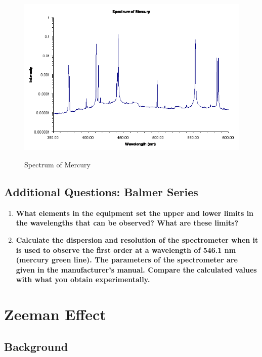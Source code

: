\documentclass{../lab}
\begin{document}
\begin{figure}[h]
    \centering
    \href{http://experimentationlab.berkeley.edu/sites/default/files/images/Atmimage015.gif}{\includegraphics[width=0.8\linewidth]{images/Atmimage015.png}}
    \caption{Spectrum of Mercury}
    \label{fig:Atmimage015}
\end{figure}

\subsection{Additional Questions: Balmer Series}


    \begin{enumerate}

       \item \textbf{What elements in the equipment set the upper and lower limits in the wavelengths that can be observed? What are these limits?}

       \item \textbf{Calculate the dispersion and resolution of the spectrometer when it is used to observe the first order at a wavelength of 546.1 nm (mercury green line). The parameters of the spectrometer are given in the manufacturer's manual. Compare the calculated values with what you obtain experimentally.}

    \end{enumerate} 


\section{Zeeman Effect}

\subsection{Background}
\end{document}
